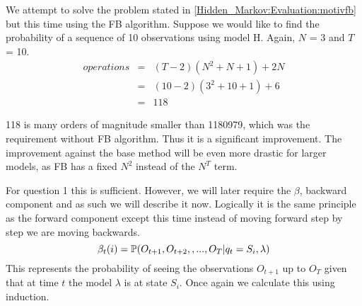     \begin{example}
        \label{Hidden_Markov:Evaluation:motivfb2}
        We attempt to solve the problem stated in \ref{Hidden_Markov:Evaluation:motivfb} but this time using the FB algorithm. Suppose we would like to find the probability of a sequence of 10 observations using model H. Again, $N$ = 3 and $T$ = 10. 
        \begin{eqnarray}
            operations & = & (T-2)(N^2 + N + 1) + 2N \\
                    & = & (10-2)(3^2 + 10 + 1) + 6\\
                    & = & 118
        \end{eqnarray}

        118 is many orders of magnitude smaller than 1180979, which was the requirement without FB algorithm. Thus it is a significant improvement. The improvement against the base method will be even more drastic for larger models, as FB has a fixed $N^2$ instead of the $N^T$ term.  
    \end{example}


    For question 1 this is sufficient. However, we will later require the $\beta$, backward component and as such we will describe it now. Logically it is the same principle as the forward component except this time instead of moving forward step by step we are moving backwards.
    \begin{equation}
        \label{Hidden_Markov:Evaluation:Forward_Backward_Algorithm:Beta}
        \beta_t(i) = \mathbb{P} (O_{t+1},O_{t+2},,...,O_T | q_t=S_i, \lambda)
    \end{equation}
    This represents the probability of seeing the observations $O_{t+1}$ up to $O_T$ given that at time $t$ the model $\lambda$ is at state $S_i$. Once again we calculate this using induction.

